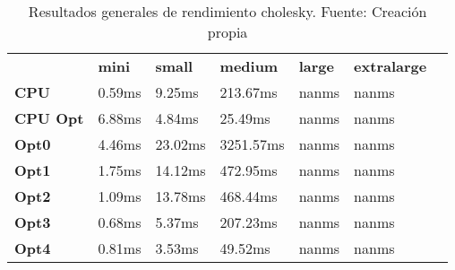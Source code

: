 \begin{table}[H]
    \centering
    \begin{tabular}{lllllll}
    \rowcolor[HTML]{DAE8FC} \ &  \textbf{mini} &  \textbf{small} &  \textbf{medium} &  \textbf{	large} &  \textbf{	extralarge} \\
    \cellcolor[HTML]{DAE8FC} \textbf{CPU} & 0.59ms & 9.25ms & 213.67ms & 	nanms & 	nanms \\
    \rowcolor[HTML]{EFEFEF} \cellcolor[HTML]{DAE8FC} \textbf{CPU Opt} & 6.88ms & 4.84ms & 25.49ms & 	nanms & 	nanms \\
    \cellcolor[HTML]{DAE8FC} \textbf{Opt0} & 4.46ms & 23.02ms & 3251.57ms & 	nanms & 	nanms \\
    \rowcolor[HTML]{EFEFEF} \cellcolor[HTML]{DAE8FC} \textbf{Opt1} & 1.75ms & 14.12ms & 472.95ms & 	nanms & 	nanms \\
    \cellcolor[HTML]{DAE8FC} \textbf{Opt2} & 1.09ms & 13.78ms & 468.44ms & 	nanms & 	nanms \\
    \rowcolor[HTML]{EFEFEF} \cellcolor[HTML]{DAE8FC} \textbf{Opt3} & 0.68ms & 5.37ms & 207.23ms & 	nanms & 	nanms \\
    \cellcolor[HTML]{DAE8FC} \textbf{Opt4} & 0.81ms & 3.53ms & 49.52ms & 	nanms & 	nanms \\
    \end{tabular}
    \caption[Resultados generales de rendimiento cholesky]{{Resultados generales de rendimiento cholesky. Fuente: Creación propia}}
    \label{table_global_cholesky_PerformanceResults_data}
\end{table}